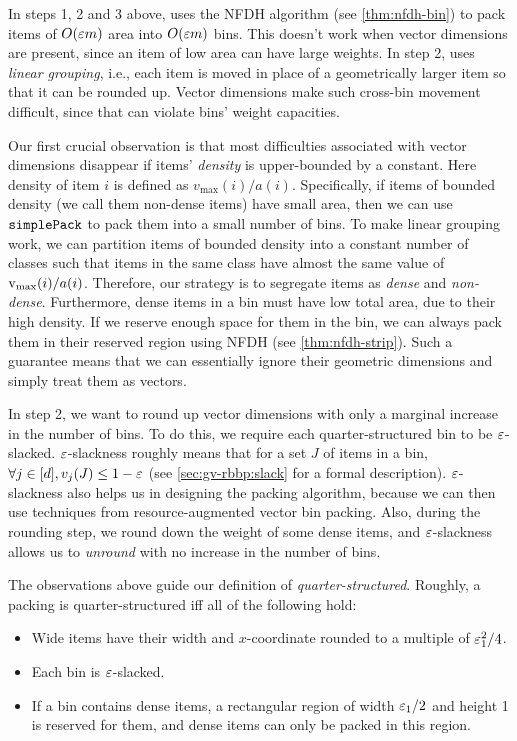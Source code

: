 In steps 1, 2 and 3 above, \cite{pradel-thesis} uses the
NFDH algorithm (see \cref{thm:nfdh-bin}) to pack
items of $O(\varepsilon m)$ area into $O(\varepsilon m)$ bins.
This doesn't work when vector dimensions are present,
since an item of low area can have large weights.
In step 2, \cite{pradel-thesis} uses \emph{linear grouping}, i.e.,
each item is moved in place of a geometrically larger item so that it can be rounded up.
Vector dimensions make such cross-bin movement difficult,
since that can violate bins' weight capacities.

Our first crucial observation is that most difficulties associated with vector dimensions
disappear if items' \emph{density} is upper-bounded by a constant. Here density of item $i$
is defined as $v_{\max}(i)/a(i)$.
Specifically, if items of bounded density (we call them non-dense items) have
small area, then we can use $\operatorname{\mathtt{simplePack}}$ to pack them into a small number of bins.
To make linear grouping work, we can partition items of bounded density into
a constant number of classes such that items in the same class
have almost the same value of $\operatorname{v_{\max}}(i)/a(i)$.
Therefore, our strategy is to segregate items as \emph{dense} and \emph{non-dense}.
Furthermore, dense items in a bin must have low total area, due to their high density.
If we reserve enough space for them in the bin, we can always pack them in their
reserved region using NFDH (see \cref{thm:nfdh-strip}).
Such a guarantee means that we can essentially ignore their geometric dimensions
and simply treat them as vectors.

In step 2, we want to round up vector dimensions with only a marginal increase in
the number of bins. To do this, we require each quarter-structured bin to be $\varepsilon$-slacked.
$\varepsilon$-slackness roughly means that for a set $J$ of items in a bin,
$\forall j \in [d], v_j(J) \le 1-\varepsilon$ (see \cref{sec:gv-rbbp:slack}
for a formal description).
$\varepsilon$-slackness also helps us in designing the packing algorithm,
because we can then use techniques from resource-augmented vector bin packing.
Also, during the rounding step, we round down the weight of some dense items,
and $\varepsilon$-slackness allows us to \emph{unround} with no increase in the number of bins.

The observations above guide our definition of \emph{quarter-structured}.
Roughly, a packing is quarter-structured iff all of the following hold:
\begin{itemize}
\item Wide items have their width and $x$-coordinate rounded to a multiple of $\varepsilon_1^2/4$.
\item Each bin is $\varepsilon$-slacked.
\item If a bin contains dense items, a rectangular region of width $\varepsilon_1/2$ and height 1
    is reserved for them, and dense items can only be packed in this region.
\end{itemize}

